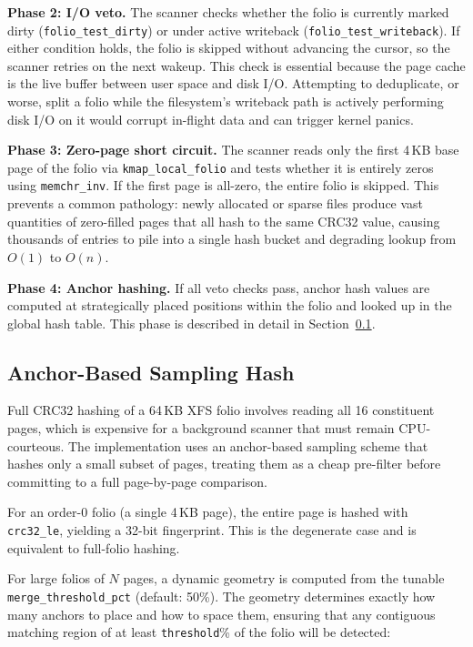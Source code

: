 \documentclass[conference]{IEEEtran}
\begin{document}
\textbf{Phase 2: I/O veto.} The scanner checks whether the folio is currently marked dirty (\texttt{folio\_test\_dirty}) or under active writeback (\texttt{folio\_test\_writeback}). If either condition holds, the folio is skipped without advancing the cursor, so the scanner retries on the next wakeup. This check is essential because the page cache is the live buffer between user space and disk I/O. Attempting to deduplicate, or worse, split a folio while the filesystem's writeback path is actively performing disk I/O on it would corrupt in-flight data and can trigger kernel panics.

\textbf{Phase 3: Zero-page short circuit.} The scanner reads only the first 4\,KB base page of the folio via \texttt{kmap\_local\_folio} and tests whether it is entirely zeros using \texttt{memchr\_inv}. If the first page is all-zero, the entire folio is skipped. This prevents a common pathology: newly allocated or sparse files produce vast quantities of zero-filled pages that all hash to the same CRC32 value, causing thousands of entries to pile into a single hash bucket and degrading lookup from $O(1)$ to $O(n)$.

\textbf{Phase 4: Anchor hashing.} If all veto checks pass, anchor hash values are computed at strategically placed positions within the folio and looked up in the global hash table. This phase is described in detail in Section~\ref{sec:anchor}.

\subsection{Anchor-Based Sampling Hash}
\label{sec:anchor}

Full CRC32 hashing of a 64\,KB XFS folio involves reading all 16 constituent pages, which is expensive for a background scanner that must remain CPU-courteous. The implementation uses an anchor-based sampling scheme that hashes only a small subset of pages, treating them as a cheap pre-filter before committing to a full page-by-page comparison.

For an order-0 folio (a single 4\,KB page), the entire page is hashed with \texttt{crc32\_le}, yielding a 32-bit fingerprint. This is the degenerate case and is equivalent to full-folio hashing.

For large folios of $N$ pages, a dynamic geometry is computed from the tunable \texttt{merge\_threshold\_pct} (default: 50\%). The geometry determines exactly how many anchors to place and how to space them, ensuring that any contiguous matching region of at least \texttt{threshold}\% of the folio will be detected:
\end{document}
